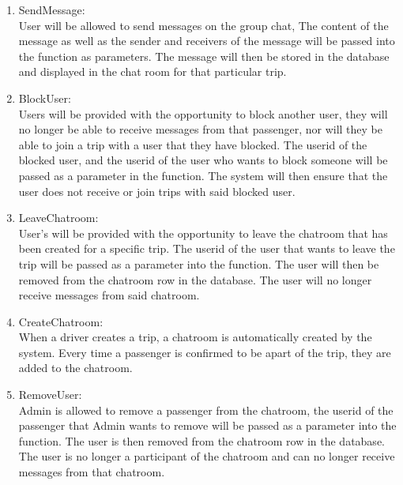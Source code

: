 \documentclass[hidelinks, 12pt, a4paper]{article}
\begin{document}
             \begin{enumerate}[label=U1.\arabic*]

                \item SendMessage:\\
                User will be allowed to send messages on the group chat, The content of the message as well as the sender and receivers of the message will be passed into the function as parameters. The message will  then be stored in the database and displayed in the chat room for that particular trip.\\
                 

                \item BlockUser:\\
                Users will be provided with the opportunity to block another user, they will no longer be able to receive messages from that passenger, nor will they be able to join a trip with a user that they have blocked. The userid of the blocked user, and the userid of the user who wants to block someone will be passed as a parameter in the function. The system will then ensure that the user does not receive or join trips with said blocked user.\\
        
               \item LeaveChatroom:\\
                User’s will be provided with the opportunity to leave the chatroom that has been created for a specific trip. The userid of the user that wants to leave the trip will be passed as a parameter into the function. The user will then be removed from the chatroom row in the database. The user will no longer receive messages from said chatroom.\\
	
                \item CreateChatroom: \\
                When a driver creates a trip, a chatroom is automatically created by the system. Every time a passenger is confirmed to be apart of the trip, they are added to the chatroom.\\
                    
                \item RemoveUser:\\
                Admin is allowed to remove a passenger from the chatroom, the userid of the passenger that Admin wants to remove will be passed as a parameter into the function. The user is then removed from the chatroom row in the database. The user is no longer a participant of the chatroom and can no longer receive messages from that chatroom.\\
                    

\end{enumerate}
\end{document}

